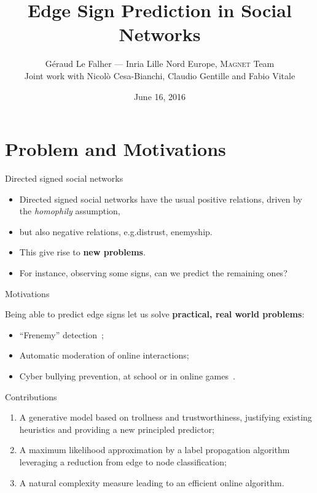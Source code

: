 \documentclass[10pt,svgnames,ignorenonframetext,final]{beamer}
\title{Edge Sign Prediction in Social Networks}
\author{Géraud Le Falher --- Inria Lille Nord Europe, \textsc{Magnet} Team\\
  Joint work with Nicolò Cesa-Bianchi, Claudio Gentille and Fabio Vitale}
\date{June 16, 2016}
\providecommand{\largelist}{%
  \setlength{\itemsep}{8pt}\setlength{\parskip}{3pt}}
\begin{document}
\frame{\titlepage}


\section{Problem and Motivations}\label{introduction}

\begin{frame}{Directed signed social networks}

  \begin{itemize}
    \largelist
    \item
      Directed signed social networks have the usual positive relations,
      driven by the \emph{homophily} assumption,
    \item
      but also \alert{negative relations}, e.g.\@ distrust, enemyship.
    \item
      This give rise to \textbf{new problems}.
    \item
      For instance, observing some signs, can we predict the remaining ones?
  \end{itemize}

\end{frame}

\begin{frame}{Motivations}

  Being able to predict edge signs let us solve \textbf{practical, real world problems}:

  \begin{itemize}
    \largelist
  \item
    ``Frenemy'' detection~\autocite{frenemy12};
  \item
    Automatic moderation of online interactions;
  \item
    Cyber bullying prevention, at school or in online games~\autocite{CyberbullyingCHI15}.
\end{itemize}

\end{frame}

\begin{frame}{Contributions}

  \begin{enumerate}
    \def\labelenumi{\arabic{enumi}.}
    \largelist
  \item
    A \alert{generative model} based on trollness and trustworthiness, justifying
    existing heuristics and providing a \alert{new principled predictor};
  \item
    A maximum likelihood approximation by a \alert{label propagation algorithm}
    leveraging a reduction from \alert{edge to node classification};
  \item
    A \alert{natural complexity measure} leading to an \alert{efficient online algorithm}.
\end{enumerate}

\end{frame}
\end{document}

